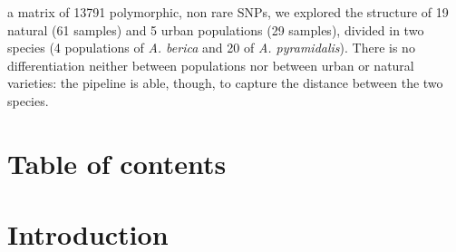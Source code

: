 \documentclass[a4paper, 12pt]{report}
\begin{document}
a matrix of 13791 polymorphic, non rare SNPs, we explored the structure of  19 natural (61 samples) and 5 urban populations (29 samples), divided in two species (4 populations of \textit{A. berica} and 20 of \textit{A. pyramidalis}). There is no differentiation neither between populations nor between urban or natural varieties: the pipeline is able, though, to capture the distance between the two species.

\clearpage
\chapter*{Table of contents}
\tableofcontents
\clearpage

\pagestyle{fancy}

\chapter{Introduction}
\end{document}
